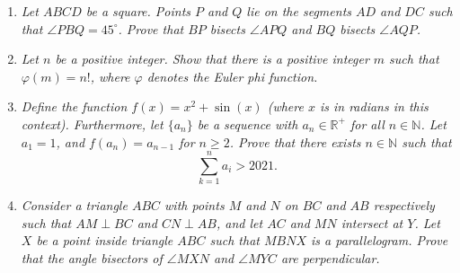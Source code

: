 \documentclass{article}
\begin{document}
\begin{enumerate}[1.]
\vspace{24pt}
\item %
{\itshape Let $ABCD$ be a square.
Points $P$ and $Q$ lie on the segments $AD$ and $DC$ such that $\angle PBQ = 45^\circ$.
Prove that $BP$ bisects $\angle APQ$ and $BQ$ bisects $\angle AQP$.}


\vspace{24pt}
\item %
{\itshape Let $n$ be a positive integer. Show that there is a positive integer $m$ such that $\varphi(m) = n!$, where $\varphi$ denotes the Euler phi function.}


\vspace{24pt}
\item %
{\itshape Define the function $f(x) = x^2 + \sin(x)$ (where $x$ is in radians in this context). Furthermore, let $\{a_n\}$ be a sequence with $a_n \in \mathbb{R}^+$ for all $n \in \mathbb{N}$. Let $a_1 = 1$, and $f(a_n) = a_{n - 1}$ for $n \ge 2$. Prove that there exists $n \in \mathbb{N}$ such that 
$$\sum_{k = 1}^n a_i > 2021.$$}


\vspace{24pt}
\item %
{\itshape Consider a triangle $ABC$ with points $M$ and $N$ on $BC$ and $AB$ respectively such that $AM \perp BC$ and $CN \perp AB$, and let $AC$ and $MN$ intersect at $Y$.
Let $X$ be a point inside triangle $ABC$ such that $MBNX$ is a parallelogram.
Prove that the angle bisectors of $\angle MXN$ and $\angle MYC$ are perpendicular.}


\end{enumerate}
\end{document}
